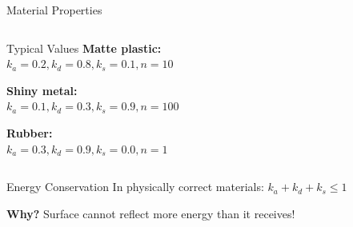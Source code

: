 \begin{frame}{Material Properties}
\begin{columns}
\begin{column}{0.4\textwidth}
      \vspace{0.5cm}
      \begin{raybox}{Typical Values}
        \footnotesize
        \textbf{Matte plastic:}\\
        $k_a=0.2, k_d=0.8, k_s=0.1, n=10$

        \vspace{0.2cm}
        \textbf{Shiny metal:}\\
        $k_a=0.1, k_d=0.3, k_s=0.9, n=100$

        \vspace{0.2cm}
        \textbf{Rubber:}\\
        $k_a=0.3, k_d=0.9, k_s=0.0, n=1$
      \end{raybox}
    \end{column}
  \end{columns}

  \vspace{0.3cm}
  \pause
  \begin{conceptbox}{Energy Conservation}
    In physically correct materials: $k_a + k_d + k_s \leq 1$

    \textbf{Why?} Surface cannot reflect more energy than it receives!
  \end{conceptbox}
\end{frame}

